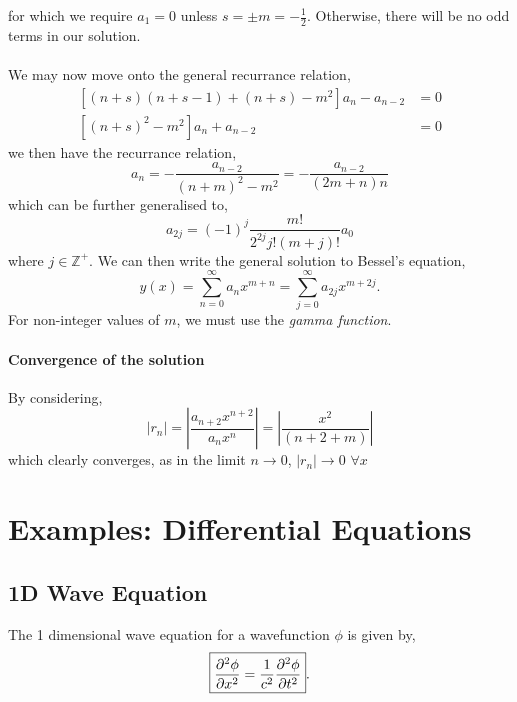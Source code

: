 \documentclass{book}
\begin{document}
for which we require $a_1 = 0$ unless $s = \pm m = -\frac{1}{2}$. Otherwise, there will be no odd terms in our solution.
\\\\
We may now move onto the general recurrance relation,
\begin{equation}
	\begin{split}
		\left[(n+s)(n+s - 1) + (n+s) - m^2\right]a_n - a_{n-2} & = 0 \\
		\left[(n+s)^2 - m^2\right]a_n + a_{n-2} & = 0
	\end{split}
\end{equation}
we then have the recurrance relation,
\begin{equation}
	a_n = -\frac{a_{n-2}}{(n+m)^2 - m^2} = -\frac{a_{n-2}}{(2m+n)n}
\end{equation}
which can be further generalised to,
\begin{equation}
	a_{2j} = (-1)^{j}\frac{m!}{2^{2j}j!(m+j)!}a_0
\end{equation}
where $j \in \mathbb{Z}^{+}$. We can then write the general solution to Bessel's equation,
\begin{equation}
	y(x) = \sum_{n=0}^{\infty}a_nx^{m+n} = \sum_{j=0}^{\infty}a_{2j}x^{m+2j}.
\end{equation}
For non-integer values of $m$, we must use the \textit{gamma function}.
\subsubsection{Convergence of the solution}
By considering,
\begin{equation}
	\left|r_n\right| = \left|\frac{a_{n+2}x^{n+2}}{a_nx^n}\right| = \left|\frac{x^2}{(n+2 +m)}\right|
\end{equation}
which clearly converges, as in the limit $n \to 0$, $\left|r_n\right| \to 0$ $\forall x$
\appendix
\chapter{Examples: Differential Equations}
\section{1D Wave Equation}
The 1 dimensional wave equation for a wavefunction $\phi$ is given by,
\begin{equation}
	\boxed{\pdv[2]{\phi}{x} = \frac{1}{c^2}\pdv[2]{\phi}{t}}. \label{eq:1dwave}
\end{equation}
\end{document}
